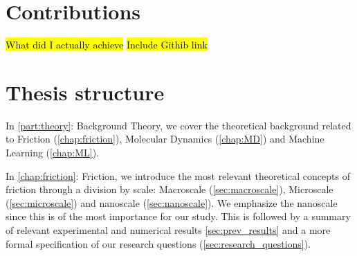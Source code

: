 






\section{Contributions}
\hl{What did I actually achieve}
\hl{Include Githib link} 

\section{Thesis structure}

In \cref{part:theory}: Background Theory, we cover the theoretical background related to Friction (\cref{chap:friction}), Molecular Dynamics (\cref{chap:MD}) and Machine Learning (\cref{chap:ML}). 

In \cref{chap:friction}: Friction, we introduce the most relevant theoretical concepts of friction through a division by scale: Macroscale (\cref{sec:macroscale}), Microscale (\cref{sec:microscale}) and nanoscale (\cref{sec:nanoscale}). We emphasize the nanoscale since this is of the most importance for our study. This is followed by a summary of relevant experimental and numerical results \cref{sec:prev_results} and a more formal specification of our research questions (\cref{sec:research_questions}). 

